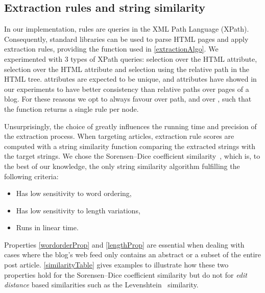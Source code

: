 \subsection{Extraction rules and string similarity}
\label{extractionrulesandstringsimilarity}

In our implementation, rules are queries in the XML Path Language 
(XPath). Consequently, standard libraries can be used to parse HTML pages 
and apply extraction rules, providing the  function used in 
\autoref{extractionAlgo}. We experimented with 3 types of XPath queries: 
selection over the HTML  attribute, selection over the HTML 
 attribute and selection using the relative path in the HTML 
tree.  attributes are expected to be unique, and  
attributes have showed in our experiments to have better consistency than 
relative paths over pages of a blog. For these reasons we opt to always 
favour  over path, and  over , such 
that the  function returns a single rule per node.

\allrulesAlgo

Unsurprisingly, the choice of  greatly influences 
the running time and precision of the extraction process. When targeting 
articles, extraction rule scores are computed with a string similarity 
function comparing the extracted strings with the target strings. 
We chose the Sorensen–Dice coefficient similarity~\cite{dice1945}, 
which is, to the best of our knowledge, the only string similarity 
algorithm fulfilling the following criteria:

\begin{itemize}
\item\label{wordorderProp} Has low sensitivity to word ordering,
\item\label{lengthProp} Has low sensitivity to length variations,
\item\label{linearProp} Runs in linear time.
\end{itemize}

Properties \ref{wordorderProp} and \ref{lengthProp} are essential when 
dealing with cases where the blog's web feed only contains an abstract 
or a subset of the entire post article. \autoref{similarityTable} 
gives examples to illustrate how these two properties hold for the 
Sorensen–Dice coefficient similarity but do not for \emph{edit distance} 
based similarities such as the Levenshtein~\cite{levenshtein1966} 
similarity.

